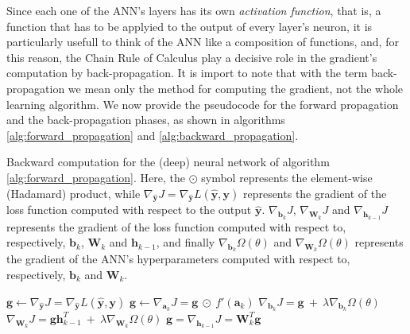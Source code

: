 		Since each one of the ANN's layers has its own
		\textit{activation function}, that is, a function that has to be applyied to the output of every layer's
		neuron, it is particularly usefull to think of the ANN like a composition of functions, and, for this
		reason, the Chain Rule of Calculus play a decisive role in the gradient's computation by back-propagation.
		It is import to note that with the term back-propagation we mean
		only the method for computing the gradient, not the whole learning algorithm. We now provide the
		pseudocode for the forward propagation and the back-propagation phases, as shown in algorithms
		\ref{alg:forward_propagation} and \ref{alg:backward_propagation}.

		\begin{algorithm}[H]
			\caption{Backward computation for the (deep) neural network of algorithm
			\ref{alg:forward_propagation}. Here, the $\odot$ symbol represents the element-wise
			(Hadamard) product, while $\nabla_{\hat{\mathbf{y}}}J =
			\nabla_{\hat{\mathbf{y}}}L(\hat{\mathbf{y}}, \mathbf{y})$ represents the gradient of the loss
			function computed with respect to the output $\hat{\mathbf{y}}$. $\nabla_{\mathbf{b}_{k}}J$,
			$\nabla_{\mathbf{W}_{k}}J$ and $\nabla_{\mathbf{h}_{k - 1}}J$ represents the gradient of the
			loss function computed with respect to, respectively, $\mathbf{b}_{k}$, $\mathbf{W}_{k}$ and
			$\mathbf{h}_{k - 1}$, and finally $\nabla_{\mathbf{b}_{k}} \Omega(\theta)$ and
			$\nabla_{\mathbf{W}_{k}} \Omega(\theta)$ represents the gradient of the ANN's hyperparameters computed
			with respect to, respectively, $\mathbf{b}_{k}$ and $\mathbf{W}_{k}$.}
			\label{alg:backward_propagation}
			\begin{algorithmic}[1]
					\State $\mathbf{g} \leftarrow \nabla_{\hat{\mathbf{y}}}J = \nabla_{\hat{\mathbf{y}}}
					L(\hat{\mathbf{y}}, \mathbf{y})$
						\State $\mathbf{g} \leftarrow \nabla_{\mathbf{a}_{k}}J = \mathbf{g} \ \odot \
						f'(\mathbf{a}_{k})$
						\State $\nabla_{\mathbf{b}_{k}}J = \mathbf{g} \ + \ \lambda \nabla_{\mathbf{b}_{k}}
						\Omega(\theta)$
						\State $\nabla_{\mathbf{W}_{k}}J = \mathbf{g}\mathbf{h}_{k - 1}^{T} \ + \ \lambda
						\nabla_{\mathbf{W}_{k}} \Omega(\theta)$
						\State $\mathbf{g} = \nabla_{\mathbf{h}_{k - 1}}J = \mathbf{W}_{k}^{T}\mathbf{g}$
					\EndFor
				\EndProcedure
			\end{algorithmic}
		\end{algorithm}

